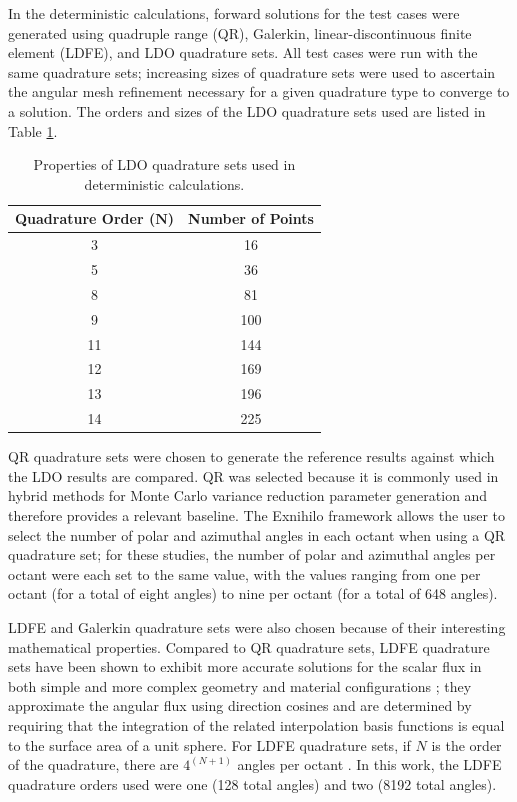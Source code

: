 \documentclass{article} %
\begin{document}
In the deterministic calculations, forward solutions for the test cases were
generated using quadruple range (QR), Galerkin, linear-discontinuous finite 
element (LDFE), and LDO quadrature sets. All test cases were run with the same 
quadrature sets; increasing sizes of quadrature sets were used to ascertain the
angular mesh refinement necessary for a given quadrature type to converge to a 
solution. The orders and sizes of the LDO quadrature sets used are listed in
Table \ref{ldo-n}.

\begin{table}[!htb]
\centering
\caption{Properties of LDO quadrature sets used in deterministic calculations.}
\begin{tabular}{cc}
\multicolumn{1}{l}{\textbf{Quadrature Order ($\mathbf{N}$)}} & 
\multicolumn{1}{l}{\textbf{Number of Points}} \\
\hline
3 & 16 \\
5 & 36 \\
8 & 81 \\
9 & 100 \\
11 & 144 \\
12 & 169 \\
13 & 196 \\
14 & 225 \\
\end{tabular}
\label{ldo-n}
\end{table}

QR quadrature sets were chosen to generate the reference results against which
the LDO results are compared. QR was selected because it is commonly used 
in hybrid methods for Monte Carlo variance reduction parameter generation and 
therefore provides a relevant baseline. The Exnihilo framework allows the user
to select the number of polar and azimuthal angles in each octant when using a
QR quadrature set; for these studies, the number of polar and azimuthal angles
per octant were each set to the same value, with the values ranging from one
per octant (for a total of eight angles) to nine per octant (for a total of
648 angles). 

LDFE and Galerkin quadrature sets were also chosen because of their interesting
mathematical properties. Compared to QR quadrature sets, LDFE quadrature sets
have been shown to exhibit more accurate solutions for the scalar flux in both 
simple and more complex geometry and material configurations \cite{ldfe}; they 
approximate the angular flux using direction cosines and are determined by
requiring that the integration of the related interpolation basis functions is
equal to the surface area of a unit sphere. For LDFE quadrature sets, if $N$ is
the order of the quadrature, there are $4^{(N+1)}$ angles per octant
\cite{exum}. In this work, the LDFE quadrature orders used were one (128 total
angles) and two (8192 total angles).
\end{document}
